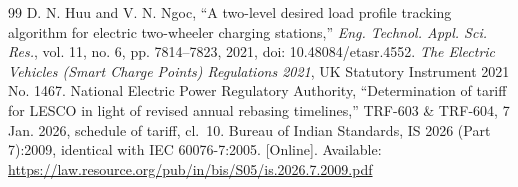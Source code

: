 \documentclass[conference]{IEEEtran}
\begin{document}
\begin{thebibliography}{99}
 D. N. Huu and V. N. Ngoc, ``A two-level desired load profile tracking algorithm for electric two-wheeler charging stations,'' \emph{Eng. Technol. Appl. Sci. Res.}, vol. 11, no. 6, pp. 7814--7823, 2021, doi: 10.48084/etasr.4552.
 \emph{The Electric Vehicles (Smart Charge Points) Regulations 2021}, UK Statutory Instrument 2021 No. 1467.
 National Electric Power Regulatory Authority, ``Determination of tariff for LESCO in light of revised annual rebasing timelines,'' TRF-603 \& TRF-604, 7 Jan. 2026, schedule of tariff, cl.~10.
 Bureau of Indian Standards, IS 2026 (Part 7):2009, identical with IEC 60076-7:2005. [Online]. Available: \url{https://law.resource.org/pub/in/bis/S05/is.2026.7.2009.pdf}
\end{thebibliography}
\end{document}
